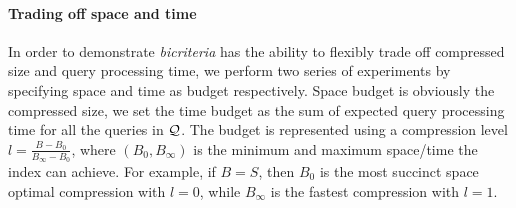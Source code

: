 \documentclass{sig-alternate-05-2015}
\begin{document}
\paragraph*{Trading off space and time}
In order to demonstrate \textit{bicriteria} has the ability to flexibly trade off compressed size and query processing time, we perform two series of experiments by specifying space and time as budget respectively.
Space budget is obviously the compressed size, we set the time budget as the sum of expected query processing time for all the queries in $ \cal Q $.
The budget is represented using a compression level $ l = \frac{B-B_0}{B_\infty-B_0} $, where $ (B_0,B_\infty) $ is the minimum and maximum space/time the index can achieve.
For example, if $ B = S $, then $ B_0 $ is the most succinct space optimal compression with $ l = 0 $, while $ B_\infty $ is the fastest compression with $ l = 1 $.
\end{document}
